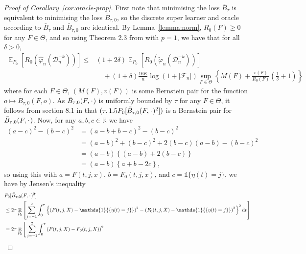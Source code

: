 \documentclass{statsoc}
\DeclareMathOperator{\E}{\mathbb{E}} %
\newcommand{\R}{\mathbb{R}}
\newcommand{\blank}{\makebox[1ex]{\textbf{$\cdot$}}}
\renewcommand{\phi}{\varphi}
\newcommand*\diff{\mathop{}\!\mathrm{d}}
\newcommand{\1}{\mathds{1}}
\newcommand{\data}{\ensuremath{\mathcal{D}}}
\begin{document}
\begin{proof}[Proof of Corollary~\ref{cor:oracle-prop}]
  First note that minimising the loss \( \bar{B}_{\tau} \) is equivalent to
  minimising the loss \( \bar{B}_{\tau,0} \), so the discrete super learner and
  oracle according to \( \bar{B}_{\tau} \) and \( \bar{B}_{\tau,0} \) are
  identical. By Lemma~\ref{lemma:norm}, \( R_0(F) \geq 0 \) for any
  \( F \in \Theta \), and so using Theorem 2.3 from \citep{vaart2006oracle} with
  \( p=1 \), we have that for all \( \delta >0 \),
\begin{align*}
  \E_{P_0}{\left[ R_0(\hat{\phi}_n(\data_n^{-k})) \right]}
  \leq
  &(1+2\delta)\E_{P_0}{\left[ R_0(\tilde{\phi}_n(\data_n^{-k})) \right]}
  \\
  & \quad + (1+\delta) \frac{16 K}{n}
    \log(1 + |\mathcal{F}_n|)\sup_{F \in \Theta}
    \left\{
    M(F) + \frac{v(F)}{R_0(F)}
    \left(
    \frac{1}{\delta} + 1
    \right)
    \right\}
\end{align*}
where for each \( F \in \Theta \), \( (M(F), v(F)) \) is some Bernstein pair for
the function \(o \mapsto \bar{B}_{\tau,0}(F, o) \). As
\( \bar{B}_{\tau,0}(F, \blank) \) is uniformly bounded by \( \tau \) for any
\( F \in \Theta \), it follows from section 8.1 in \citep{vaart2006oracle} that
\( (\tau, 1.5 P_0{[\bar{B}_{\tau,0}(F, \blank)^2]}) \) is a Bernstein pair for
\( \bar{B}_{\tau,0}(F, \blank) \). Now, for any \( a,b,c \in \R \) we have
\begin{align*}
  (a-c)^2 - (b-c)^2
  & = (a-b+b-c)^2 - (b-c)^2
  \\
  & = (a-b)^2 + (b-c)^2 +2(b-c)(a-b) - (b-c)^2
  \\
  & = (a-b)
    \left\{
    (a-b) +  2(b-c)
    \right\}
  \\
  & = (a-b)
    \left\{
     a + b -2c
    \right\},
\end{align*}
so using this with \( a=F(t, j, x) \), \( b=F_0(t, j, x) \), and
\( c = \1{\{\eta(t) = j\}} \), we have by Jensen's inequality
\begin{align*}
  & P_0{[\bar{B}_{\tau,0}(F, \blank)^2]}
  \\
  & \leq
    2\tau\E_{P_0}{\left[
    \sum_{j=-1}^{2} \int_0^{\tau}
    \left\{
    \left(
    F(t, j, X) - \1{\{\eta(t) = j\}}
    \right)^2
    -
    \left(
    F_0(t, j, X) - \1{\{\eta(t) = j\}}
    \right)^2
    \right\}^2
    \diff t 
    \right]}
  \\
  & =2\tau
    \E_{P_0}\Bigg[
    \sum_{j=-1}^{2} \int_0^{\tau}
    \left(
    F(t, j, X) - F_0(t, j, X)
    \right)^2
  \\

\end{align*}
\end{proof}
\end{document}

